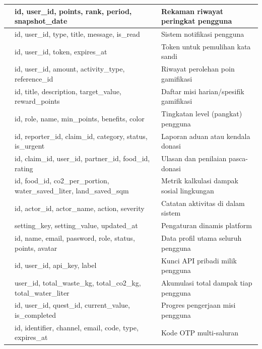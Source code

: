 \begin{xltabular}{\textwidth}{|L|L|L|}
    \hline
     & id, user\_id, points, rank, period, snapshot\_date & Rekaman riwayat peringkat pengguna \\
    \hline
     & id, user\_id, type, title, message, is\_read & Sistem notifikasi pengguna \\
    \hline
     & id, user\_id, token, expires\_at & Token untuk pemulihan kata sandi \\
    \hline
     & id, user\_id, amount, activity\_type, reference\_id & Riwayat perolehan poin gamifikasi \\
    \hline
     & id, title, description, target\_value, reward\_points & Daftar misi harian/spesifik gamifikasi \\
    \hline
     & id, role, name, min\_points, benefits, color & Tingkatan level (pangkat) pengguna \\
    \hline
     & id, reporter\_id, claim\_id, category, status, is\_urgent & Laporan aduan atau kendala donasi \\
    \hline
     & id, claim\_id, user\_id, partner\_id, food\_id, rating & Ulasan dan penilaian pasca-donasi \\
    \hline
     & id, food\_id, co2\_per\_portion, water\_saved\_liter, land\_saved\_sqm & Metrik kalkulasi dampak sosial lingkungan \\
    \hline
     & id, actor\_id, actor\_name, action, severity & Catatan aktivitas di dalam sistem \\
    \hline
     & setting\_key, setting\_value, updated\_at & Pengaturan dinamis platform \\
    \hline
     & id, name, email, password, role, status, points, avatar & Data profil utama seluruh pengguna \\
    \hline
     & id, user\_id, api\_key, label & Kunci API pribadi milik pengguna \\
    \hline
     & user\_id, total\_waste\_kg, total\_co2\_kg, total\_water\_liter & Akumulasi total dampak tiap pengguna \\
    \hline
     & id, user\_id, quest\_id, current\_value, is\_completed & Progres pengerjaan misi pengguna \\
    \hline
     & id, identifier, channel, email, code, type, expires\_at & Kode OTP multi-saluran \\
    \hline
\end{xltabular}
\fi

